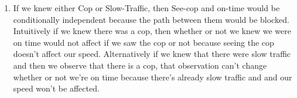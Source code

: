 \documentclass[submit]{harvardml}
\begin{document}
\begin{enumerate}
\begin{center}
\begin{tikzpicture}[shorten >=1pt,node distance=3cm,on grid,auto]
	\end{tikzpicture}
	\end{center}
	
	\item If we knew either Cop or Slow-Traffic, then See-cop and on-time would be conditionally independent because the path between them would be blocked.  Intuitively if we knew there was a cop, then whether or not we knew we were on time would not affect if we saw the cop or not because seeing the cop doesn't affect our speed.  Alternatively if we knew that there were slow traffic and then we observe that there is a cop, that observation can't change whether or not we're on time because there's already slow traffic and and our speed won't be affected.   
	
	
\end{enumerate}





\newpage
\end{document}
